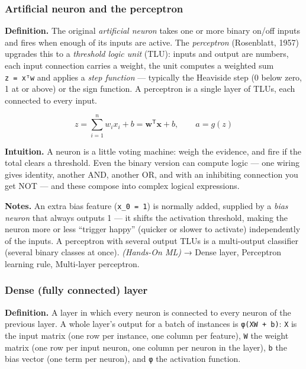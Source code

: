 \documentclass[
  10pt,
  letterpaper,
  onecolumn]{article}
\begin{document}
\hypertarget{artificial-neuron-and-the-perceptron}{%
\subsubsection{Artificial neuron and the
perceptron}\label{artificial-neuron-and-the-perceptron}}

\textbf{Definition.} The original \emph{artificial neuron} takes one or
more binary on/off inputs and fires when enough of its inputs are
active. The \emph{perceptron} (Rosenblatt, 1957) upgrades this to a
\emph{threshold logic unit} (TLU): inputs and output are numbers, each
input connection carries a weight, the unit computes a weighted sum
\texttt{z\ =\ xᵀw} and applies a \emph{step function} --- typically the
Heaviside step (0 below zero, 1 at or above) or the sign function. A
perceptron is a single layer of TLUs, each connected to every input.

\begin{equation*}
z=\sum_{i=1}^{n}w_ix_i+b=\mathbf{w}^{\mathsf T}\mathbf{x}+b,
\qquad
a=g(z)
\end{equation*}

\textbf{Intuition.} A neuron is a little voting machine: weigh the
evidence, and fire if the total clears a threshold. Even the binary
version can compute logic --- one wiring gives identity, another AND,
another OR, and with an inhibiting connection you get NOT --- and these
compose into complex logical expressions.

\textbf{Notes.} An extra bias feature (\texttt{x\_0\ =\ 1}) is normally
added, supplied by a \emph{bias neuron} that always outputs 1 --- it
shifts the activation threshold, making the neuron more or less
``trigger happy'' (quicker or slower to activate) independently of the
inputs. A perceptron with several output TLUs is a multi-output
classifier (several binary classes at once). \emph{(Hands-On ML)} →
Dense layer, Perceptron learning rule, Multi-layer perceptron.

\hypertarget{dense-fully-connected-layer}{%
\subsubsection{Dense (fully connected)
layer}\label{dense-fully-connected-layer}}

\textbf{Definition.} A layer in which every neuron is connected to every
neuron of the previous layer. A whole layer's output for a batch of
instances is \texttt{φ(XW\ +\ b)}: \texttt{X} is the input matrix (one
row per instance, one column per feature), \texttt{W} the weight matrix
(one row per input neuron, one column per neuron in the layer),
\texttt{b} the bias vector (one term per neuron), and \texttt{φ} the
activation function.
\end{document}

